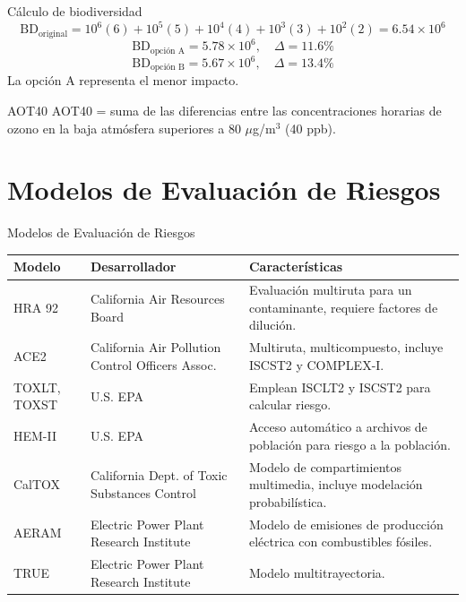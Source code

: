 \documentclass[10pt,compress]{beamer}
\begin{document}
\begin{frame}{Cálculo de biodiversidad}
\[
\text{BD}_{\text{original}} = 10^6(6) + 10^5(5) + 10^4(4) + 10^3(3) + 10^2(2) = 6.54\times10^6
\]
\[
\text{BD}_{\text{opción A}} = 5.78\times10^6, \quad \Delta = 11.6\%
\]
\[
\text{BD}_{\text{opción B}} = 5.67\times10^6, \quad \Delta = 13.4\%
\]
La opción A representa el menor impacto.
\end{frame}

\begin{frame}{AOT40}
AOT40 = suma de las diferencias entre las concentraciones horarias de ozono en la baja atmósfera superiores a 80 $\mu$g/m$^3$ (40 ppb).
\end{frame}

\section{Modelos de Evaluación de Riesgos}
\begin{frame}{Modelos de Evaluación de Riesgos}
\begin{table}
\centering
\begin{tabular}{p{2.5cm}p{3cm}p{4cm}}
\toprule
\textbf{Modelo} & \textbf{Desarrollador} & \textbf{Características} \\
\midrule
HRA 92 & California Air Resources Board & Evaluación multiruta para un contaminante, requiere factores de dilución. \\
ACE2 & California Air Pollution Control Officers Assoc. & Multiruta, multicompuesto, incluye ISCST2 y COMPLEX-I. \\
TOXLT, TOXST & U.S. EPA & Emplean ISCLT2 y ISCST2 para calcular riesgo. \\
HEM-II & U.S. EPA & Acceso automático a archivos de población para riesgo a la población. \\
CalTOX & California Dept. of Toxic Substances Control & Modelo de compartimientos multimedia, incluye modelación probabilística. \\
AERAM & Electric Power Plant Research Institute & Modelo de emisiones de producción eléctrica con combustibles fósiles. \\
TRUE & Electric Power Plant Research Institute & Modelo multitrayectoria. \\
\bottomrule
\end{tabular}
\end{table}
\end{frame}
\end{document}
